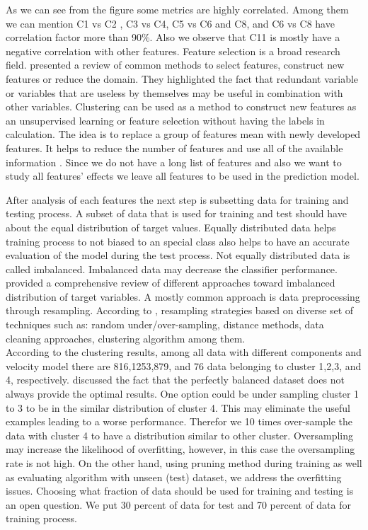 As we can see from the figure some metrics are highly correlated. Among them we can mention C1 vs C2 , C3 vs C4, C5 vs C6 and C8, and C6 vs C8 have correlation factor more than 90\%. Also we observe that C11 is mostly have a negative correlation with other features. Feature selection is a broad research field. \citet{Guyon_2003} presented a review of common methods to select features, construct new features or reduce the domain. They highlighted the fact that redundant variable or variables that are useless by themselves may be useful in combination with other variables. Clustering can be used as a method to construct new features as an unsupervised learning or feature selection without having the labels in calculation. The idea is to replace a group of features mean with newly developed features. It helps to reduce the number of features and use all of the available information \citep{Duda_1973,Guyon_2003}. Since we do not have a long list of features and also we want to study all features' effects we leave all features to be used in the prediction model. 

After analysis of each features the next step is subsetting data for training and testing process. A subset of data that is used for training and test should have about the equal distribution of target values. Equally distributed data helps training process to not biased to an special class also helps to have an accurate evaluation of the model during the test process. Not equally distributed data is called imbalanced. Imbalanced data may decrease the classifier performance. \citet{Branco_2015} provided a comprehensive review of different approaches toward imbalanced distribution of target variables. A mostly common approach is data preprocessing through resampling. According to \citet{Branco_2015}, resampling strategies based on diverse set of techniques such as: random under/over-sampling, distance methods, data cleaning approaches, clustering algorithm among them.\\
According to the clustering results, among all data with different components and velocity model there are 816,1253,879, and 76 data belonging to cluster 1,2,3, and 4, respectively. \citet{Weiss_2003} discussed the fact that the perfectly balanced dataset does not always provide the optimal results. One option could be under sampling cluster 1 to 3 to be in the similar distribution of cluster 4. This may eliminate the useful examples leading to a worse performance. Therefor we 10 times over-sample the data with cluster 4 to have a distribution similar to other cluster. Oversampling may increase the likelihood of overfitting, however, in this case the oversampling rate is not high. On the other hand, using pruning method during training as well as evaluating algorithm with unseen (test) dataset, we address the overfitting issues.  Choosing what fraction of data should be used for training and testing is an open question. We put 30 percent of data for test and 70 percent of data for training process. 

